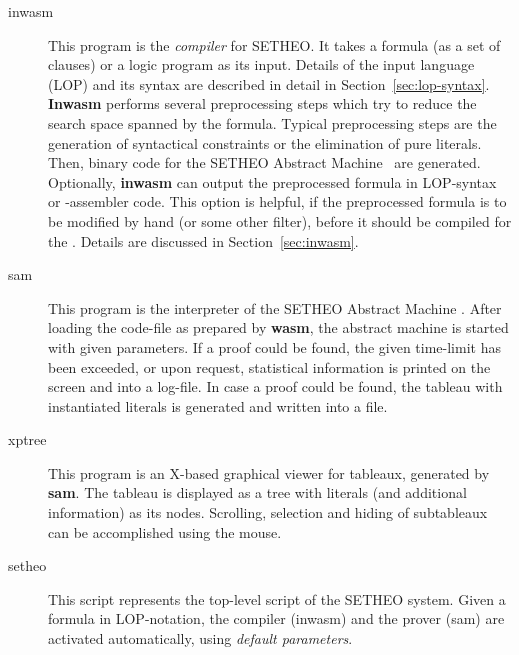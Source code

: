\begin{description}

\item[inwasm]
This program is the {\em compiler\/} for SETHEO. It takes a formula
(as a set of clauses) or a logic program as its input. Details of the
input language (LOP) and its syntax are described in detail in
Section~\ref{sec:lop-syntax}.
{\bf Inwasm} performs several preprocessing steps which try
to reduce the search space spanned by the formula. Typical preprocessing
steps are the generation of syntactical constraints or the elimination
of pure literals.
Then, binary code for the SETHEO Abstract Machine \SAM\ 
are generated. Optionally, {\bf inwasm} can output 
the preprocessed formula in LOP-syntax or \SAM-assembler code.
This option is helpful, if the preprocessed formula is to be
modified by hand (or some other filter), before it should be compiled
for the \SAM.
Details are discussed in Section~\ref{sec:inwasm}.

 
\item[sam]
This program is the interpreter of the SETHEO Abstract Machine
\SAM. After loading the code-file as prepared by {\bf wasm}, the
abstract machine is started with given parameters.
If a proof could be found, the given time-limit has been exceeded,
or upon request, statistical information is printed on the screen
and into a log-file. In case a proof could be found, the tableau
with instantiated literals is generated and written into a file.

\item[xptree]
This program is an X-based graphical viewer for tableaux, generated
by {\bf sam}. The tableau is displayed as a tree with literals
(and additional information) as its nodes. Scrolling, selection and
hiding of subtableaux can be accomplished using the mouse.

\item[setheo]
This script represents the top-level script of the SETHEO system.
Given a formula in LOP-notation, the compiler (inwasm) and the
prover (sam) are activated automatically, using {\em default parameters}.

\end{description}

